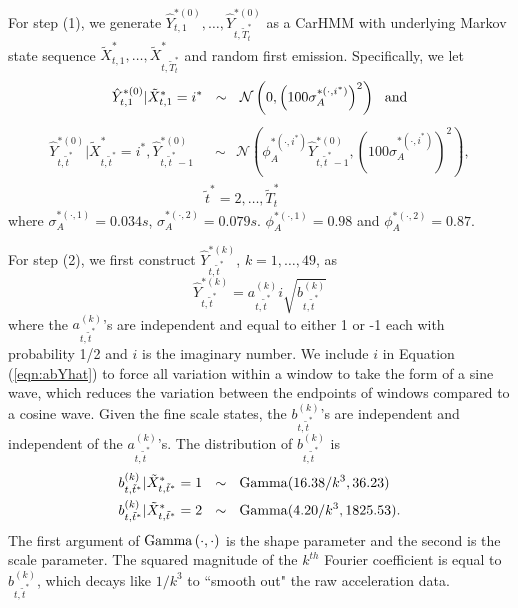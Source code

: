 For step (1), we generate $\hat Y^{*(0)}_{t,1}, \ldots, \hat Y^{*(0)}_{t,\tilde T_t^*}$ as a CarHMM with underlying Markov state sequence $\tilde X^{*}_{t,1}, \ldots, \tilde X^{*}_{t,\tilde T_t^*}$ and random first emission. Specifically, we let
   \[
    	\hat{Y}^{*(0)}_{t,1}|\tilde X^*_{t,1} = i^* ~~\sim~~ \mathcal{N} \left(0, \left(100\sigma_A^{*(\cdot,i^*)}\right)^2 \right)
    	~~{\rm{and}}
   \]
     \begin{align}	
       \hat{Y}^{*(0)}_{t,\tilde t^*}|\tilde X^*_{t,\tilde t^*} = i^*,\hat{Y}^{*(0)}_{t,\tilde t^*-1}
       &~~\sim ~~\mathcal{N} \left(\phi_A^{*(\cdot,i^*)} \hat{Y}^{*(0)}_{t,\tilde t^*-1}, \left(100\sigma_A^{*(\cdot,i^*)}\right)^2 \right), \label{eqn:yhat_0} \\
        &\tilde t^* = 2,\ldots, \tilde T^*_t
    	\nonumber
    \end{align}
    where $\sigma_A^{*(\cdot,1)} = 0.034s$,  $\sigma_A^{*(\cdot,2)} = 0.079s$. $\phi_A^{*(\cdot,1)} = 0.98$ and $\phi_A^{*(\cdot,2)} = 0.87$. 
  
 For step (2),
 we first construct $\hat{Y}^{*(k)}_{t,\tilde t^*}$, $k=1,\ldots, 49$, as
    \begin{equation}
        \hat{Y}^{*(k)}_{t,\tilde t^*} = a_{t,\tilde t^*}^{(k)} i\sqrt{b^{(k)}_{t,\tilde t^*}}
        \label{eqn:abYhat}
    \end{equation}
    where the $a^{(k)}_{t,\tilde t^*}$'s are independent and equal to either 1 or -1 each with probability 1/2 and $i$ is the imaginary number. We include $i$ in Equation (\ref{eqn:abYhat}) to force all variation within a window to take the form of a sine wave, which reduces the variation between the endpoints of windows compared to a cosine wave.
    Given the fine scale states, the $b^{(k)}_{t,\tilde t^*}$'s are independent and independent of the  $a^{(k)}_{t,\tilde t^*}$'s.  
   The distribution of $b^{(k)}_{t,\tilde t^*}$ is
    \begin{align}
    \begin{split}
    	b^{(k)}_{t,\tilde t^*}|\tilde X^*_{t,\tilde t^*} = 1 &~~\sim~~ {\rm{Gamma}}(16.38/k^3, 36.23) \\
    	b^{(k)}_{t,\tilde t^*}|\tilde X^*_{t,\tilde t^*} = 2  &~~\sim ~~{\rm{Gamma}}(4.20/k^3, 1825.53). \\ 
    \end{split}
    \label{eqn:bdist}
    \end{align}
    The first argument of ${\rm{Gamma}}\left(\cdot,\cdot\right)$ is the shape parameter and the second is the scale parameter. The squared magnitude of the $k^{th}$ Fourier coefficient is equal to $b^{(k)}_{t,\tilde t^*}$, which decays like $1/k^3$ to ``smooth out" the raw acceleration data.
    
